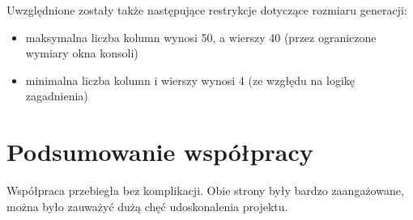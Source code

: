 \documentclass[a4paper]{article}
\begin{document}
Uwzgl\k{e}dnione zosta\l{}y tak\.ze nast\k{e}puj\k{a}ce restrykcje dotycz\k{a}ce rozmiaru generacji:
\begin{itemize}
	\item maksymalna liczba kolumn wynosi 50, a wierszy 40 (przez ograniczone wymiary okna konsoli) 
	\item minimalna liczba kolumn i wierszy wynosi 4 (ze wzg\l{}\k{e}du na logik\k{e} zagadnienia)
\end{itemize}

\section{Podsumowanie wsp\'o\l{}pracy}
\quad Wsp\'o\l{}praca przebieg\l{}a bez komplikacji. 
Obie strony by\l{}y bardzo zaanga\.zowane, mo\.zna by\l{}o zauwa\.zy\'c du\.z\k{a} ch\k{e}\'c udoskonalenia projektu.
\end{document}
